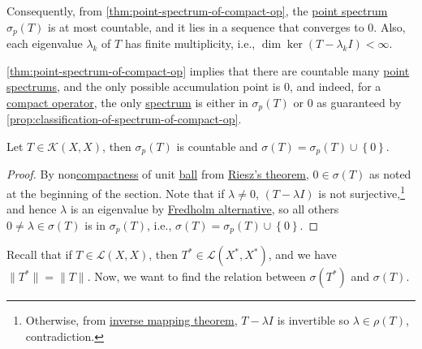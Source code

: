 \begin{remark}
	Consequently, from \autoref{thm:point-spectrum-of-compact-op}, the \hyperref[def:point-spectrum]{point spectrum} \(\sigma _p(T)\) is at most countable, and it lies in a sequence that converges to \(0\). Also, each eigenvalue \(\lambda _k\) of \(T\) has finite multiplicity, i.e., \(\dim \ker (T-\lambda _k I) < \infty \).
\end{remark}

\autoref{thm:point-spectrum-of-compact-op} implies that there are countable many \hyperref[def:point-spectrum]{point spectrums}, and the only possible accumulation point is \(0\), and indeed, for a \hyperref[def:compact-op]{compact operator}, the only \hyperref[def:spectrum-point]{spectrum} is either in \(\sigma _p(T)\) or \(0\) as guaranteed by \autoref{prop:classification-of-spectrum-of-compact-op}.

\begin{proposition}\label{prop:classification-of-spectrum-of-compact-op}
	Let \(T\in \mathcal{K} (X, X)\), then \(\sigma _p(T)\) is countable and \(\sigma (T) = \sigma _p(T) \cup \left\{ 0 \right\} \).
\end{proposition}
\begin{proof}
	By non\hyperref[def:compact]{compactness} of unit \hyperref[def:ball]{ball} from \hyperref[thm:Riesz]{Riesz's theorem}, \(0\in \sigma (T)\) as noted at the beginning of the section. Note that if \(\lambda \neq 0\), \((T - \lambda I)\) is not surjective,\footnote{Otherwise, from \hyperref[thm:inverse-mapping]{inverse mapping theorem}, \(T-\lambda I\) is invertible so \(\lambda \in \rho (T)\), contradiction.} and hence \(\lambda \) is an eigenvalue by \hyperref[thm:Fredholm-alternative]{Fredholm alternative}, so all others \(0 \neq \lambda \in \sigma (T)\) is in \(\sigma _p(T)\), i.e., \(\sigma (T) = \sigma _p(T) \cup \left\{ 0 \right\} \).
\end{proof}

Recall that if \(T\in \mathcal{L} (X, X)\), then \(T^{\ast} \in \mathcal{L} (X^{\ast} , X^{\ast} )\), and we have \(\lVert T^{\ast}  \rVert = \lVert T \rVert \). Now, we want to find the relation between \(\sigma (T^{\ast} )\) and \(\sigma (T)\).

